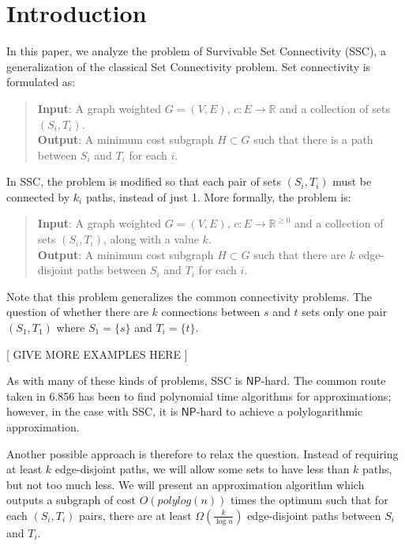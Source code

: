 \documentclass[12pt]{article}
\begin{document}
\maketitle

\section{Introduction}

In this paper, we analyze the problem of Survivable Set Connectivity (SSC), a generalization of the classical Set Connectivity problem. Set connectivity is formulated as:
\begin{quote}
\textbf{Input}: A graph weighted $G = (V, E)$, $c: E \rightarrow \mathbb{R}$ and a collection of sets $(S_i, T_i)$. \\
\textbf{Output}: A minimum cost subgraph $H \subset G$ such that there is a path between $S_i$ and $T_i$ for each $i$. 
\end{quote}
In SSC, the problem is modified so that each pair of sets $(S_i,T_i)$ must be connected by $k_i$ paths, instead of just 1. More formally, the problem is:

\begin{quote}
\textbf{Input}: A graph weighted $G = (V, E)$, $c: E \rightarrow \mathbb{R}^{\geq 0}$ and a collection of sets $(S_i, T_i)$, along with a value $k$. \\
\textbf{Output}: A minimum cost subgraph $H \subset G$ such that there are $k$ edge-disjoint paths between $S_i$ and $T_i$ for each $i$. 
\end{quote}

Note that this problem generalizes the common connectivity problems. The question of whether there are $k$ connections between $s$ and $t$ sets only one pair $(S_1, T_1)$ where $S_1 = \{ s \}$ and $T_i = \{ t \}$. 

[ GIVE MORE EXAMPLES HERE ]

As with many of these kinds of problems, SSC is $\mathsf{NP}$-hard. The common route taken in 6.856 has been to find polynomial time algorithms for approximations; however, in the case with SSC, it is $\mathsf{NP}$-hard to achieve a polylogarithmic approximation. 

Another possible approach is therefore to relax the question. Instead of requiring at least $k$ edge-disjoint paths, we will allow some sets to have less than $k$ paths, but not too much less. We will present an approximation algorithm which outputs a subgraph of cost $O(polylog(n))$ times the optimum such that for each $(S_i, T_i)$ pairs, there are at least $\Omega(\frac{k}{\log n})$ edge-disjoint paths between $S_i$ and $T_i$. 
\end{document}
